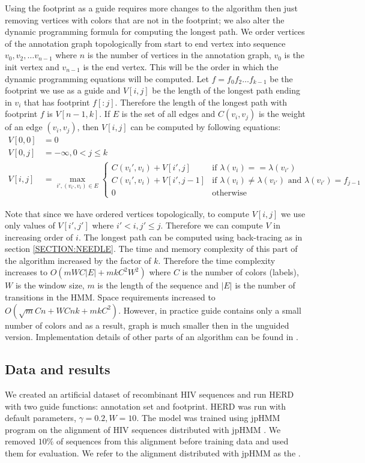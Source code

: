 Using the footprint as a guide requires more changes to the algorithm then just
removing vertices with colors that are not in the footprint; we also alter the
dynamic programming formula for computing the longest path.  We order vertices
of the annotation graph topologically from start to end vertex into sequence
$v_0, v_2, \dots v_{n-1}$ where $n$ is the number of vertices in the annotation
graph, $v_0$ is the init vertex and $v_{n-1}$ is the end vertex.  This will be
the order in which the dynamic programming equations will be computed.  Let
$f=f_0f_2\dots f_{k-1}$ be the footprint we use as a guide and $V[i, j]$ be the
length of the longest path ending in $v_i$ that has footprint $f[:j]$.
Therefore the length of the longest path with footprint $f$ is $V[n - 1, k]$.
If $E$ is the set of all edges and $C(v_i, v_j)$ is the weight of an edge
$(v_i, v_j)$, then $V[i, j]$ can be computed by following equations: 
\begin{align} 
V[0, 0] &= 0 \\ V[0, j] &= -\infty, 0< j \leq k \\
V[i, j] &= \max_{i', (v_{i'}, v_i)\in E} 
\begin{cases} 
C(v_i', v_i) + V[i', j]& \text{if $\lambda(v_i) == \lambda(v_{i'})$}\\
C(v_i', v_i) + V[i', j-1]& \text{if $\lambda(v_i) \not= \lambda(v_{i'})$ and $\lambda(v_{i'})=f_{j-1}$}\\
0 & \text{otherwise} 
\end{cases} 
\end{align}

Note that since we have ordered vertices topologically, to compute $V[i, j]$ we
use only values of $V[i', j']$ where $i'< i, j'\leq j$. Therefore we can compute
$V$ in increasing order of $i$. The longest path can be computed using
back-tracing as in section \ref{SECTION:NEEDLE}. The time and memory complexity 
of this part of the algorithm increased by the factor of $k$. Therefore the
time complexity increases to $O(mWC|E|+mkC^2W^2)$ where $C$ is the number of
colors (labels), $W$ is the window size, $m$ is the length of the sequence and
$|E|$ is the number of transitions in the HMM.  Space requirements increased to
$O(\sqrt{m}Cn+WCnk+mkC^2)$. However, in practice guide contains only a small
number of colors and as a result, graph is much smaller then in the unguided
version. Implementation details of other parts of an algorithm can be found in
\cite{Nanasi2010mgr}.

\subsection{Data and results}
We created an artificial dataset of recombinant HIV sequences and run HERD with
two guide functions: annotation set and footprint. HERD was run with default
parameters, $\gamma=0.2, W=10$. The model was trained using jpHMM program on
the alignment of HIV sequences distributed with jpHMM \cite{Schultz2006}. We
removed $10\%$ of sequences from this alignment before training data and used
them for evaluation. We refer to the alignment distributed with jpHMM as the
.

